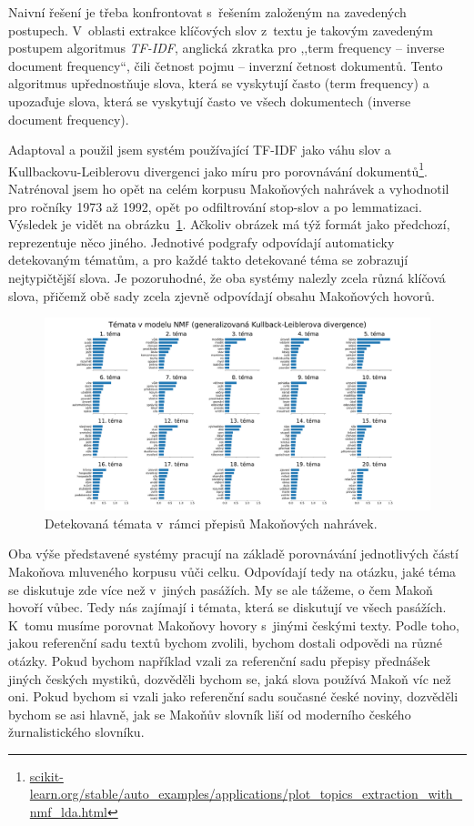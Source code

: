 Naivní řešení je třeba konfrontovat s~řešením založeným na zavedených postupech.
V~oblasti extrakce klíčových slov z~textu je takovým zavedeným postupem
algoritmus \textit{TF-IDF}\cite{Beel2016-11Resea-32348}, anglická zkratka pro
,,term frequency -- inverse document frequency``, čili četnost pojmu -- inverzní
četnost dokumentů. Tento algoritmus upřednostňuje slova, která se vyskytují
často (term frequency) a upozaďuje slova, která se vyskytují často ve všech
dokumentech (inverse document frequency).

Adaptoval a použil jsem systém používající TF-IDF jako váhu slov a
Kull\-back\-ovu-Leib\-ler\-ovu divergenci
jako míru pro porovnávání
dokumentů\footnote{\href{https://scikit-learn.org/stable/auto\_examples/applications/plot\_topics\_extraction\_with\_nmf\_lda.html}{scikit-learn.org/stable/auto\_examples/applications/plot\_topics\_extraction\_with\_nmf\_lda.html}}.
Natrénoval jsem ho opět na celém korpusu Makoňových nahrávek a vyhodnotil pro
ročníky 1973 až 1992, opět po odfiltrování stop-slov a po lemmatizaci. Výsledek
je vidět na obrázku~\ref{fig:topic-by-year-kld}. Ačkoliv obrázek má týž formát
jako předchozí, reprezentuje něco jiného. Jednotivé podgrafy odpovídají
automaticky detekovaným tématům, a pro každé takto detekované téma se zobrazují
nejtypičtější slova.
Je pozoruhodné, že oba systémy nalezly zcela různá klíčová slova, přičemž obě
sady zcela zjevně odpovídají obsahu Makoňových hovorů.

\begin{figure}[htpb]
\includegraphics[scale=0.32, angle=90]{rc/topics-by-year-kld.pdf}
\caption{Detekovaná témata v~rámci přepisů Makoňových nahrávek.}
\label{fig:topic-by-year-kld}
\end{figure}

Oba výše představené systémy pracují na základě porovnávání jednotlivých částí
Makoňova mluveného korpusu vůči celku. Odpovídají tedy na otázku, jaké téma se
diskutuje zde více než v~jiných pasážích. My se ale tážeme, o čem Makoň hovoří
vůbec. Tedy nás zajímají i témata, která se diskutují ve všech pasážích. K~tomu
musíme porovnat Makoňovy hovory s~jinými českými texty. Podle toho, jakou
referenční sadu textů bychom zvolili, bychom dostali odpovědi na různé otázky.
Pokud bychom například vzali za referenční sadu přepisy přednášek jiných českých
mystiků, dozvěděli bychom se, jaká slova používá Makoň víc než oni. Pokud bychom
si vzali jako referenční sadu současné české noviny, dozvěděli bychom se asi
hlavně, jak se Makoňův slovník liší od moderního českého žurnalistického
slovníku.

